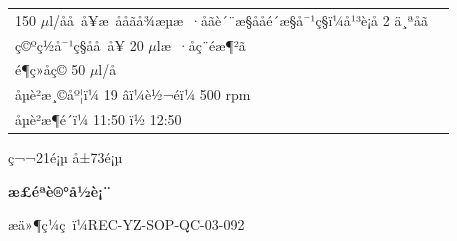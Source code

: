 \documentclass[UTF8,10pt,a4paper,fontset=fandol]{ctexart}
\newcommand{\fieldvalue}[1]{#1}
\newcommand{\handwritten}[1]{#1}
\begin{document}
\begin{tabularx}{\textwidth}{|p{}|X|}
\fieldvalue{\handwritten{150}} $\mu$l/å­å å¥æ ååãå¾æµæ ·åãè´¨æ§ååé´æ§å¯¹ç§ï¼å¹³è¡å
\fieldvalue{\handwritten{2}} ä¸ªå­ã\\
ç©ºç½å¯¹ç§å­å å¥
\fieldvalue{\handwritten{20}} $\mu$læ ·åç¨éæ¶²ã\\
é¶ç»åç©
\fieldvalue{\handwritten{50}} $\mu$l/å­\\
å­µè²æ¸©åº¦ï¼
\fieldvalue{\handwritten{19}} âï¼è½¬éï¼
\fieldvalue{\handwritten{500}} rpm\\
å­µè²æ¶é´ï¼
\fieldvalue{\handwritten{11:50}} ï½ 
\fieldvalue{\handwritten{12:50}}\\
\hline
\end{tabularx}

\begin{center}
\small ç¬¬21é¡µ å±73é¡µ
\end{center}

\newpage

\begin{center}
\textbf{æ£éªè®°å½è¡¨}
\end{center}

\noindent
æä»¶ç¼ç ï¼REC-YZ-SOP-QC-03-092
\end{document}
